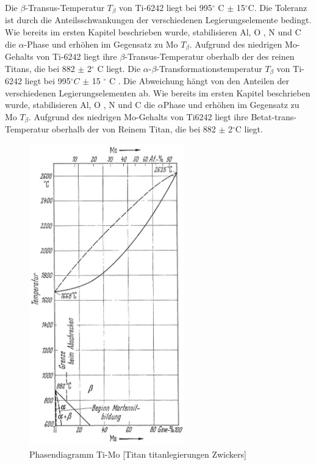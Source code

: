 	Die $\beta$-Transus-Temperatur $T_{\beta}$ von Ti-6242 liegt bei 995$^\circ$ C $\pm$ 15$^\circ$C. Die Toleranz ist durch die Anteilsschwankungen der verschiedenen Legierungselemente bedingt. Wie bereits im ersten Kapitel beschrieben wurde, stabilisieren  Al, O , N und C die $\alpha$-Phase und erhöhen im Gegensatz zu Mo $T_{\beta}$.
	Aufgrund des niedrigen Mo-Gehalts von Ti-6242 liegt ihre $\beta$-Transus-Temperatur oberhalb der des reinen Titans, die bei 882 $\pm$ 2$^\circ$ C liegt.
	Die $\alpha$-$\beta$-Transformationstemperatur $T_{\beta}$ von Ti-6242 liegt bei 995$^\circ C$ $\pm$ 15 $^\circ$ C . Die Abweichung hängt  von den Anteilen der verschiedenen Legierungselementen ab. Wie bereits im ersten Kapitel beschrieben wurde, stabilisieren  Al, O , N und C die $\alpha$Phase und erhöhen im Gegensatz zu Mo  {$T_{\beta}$}.
	Aufgrund des niedrigen Mo-Gehalts von Ti6242 liegt ihre Betat-trans-Temperatur oberhalb der von Reinem Titan, die bei 882 $\pm$ 2$^\circ$C liegt.
	
	
	\begin{figure}[H]
		\centering
		\includegraphics[width= 0.6\textwidth]{Bilder/TiMo}
		\caption{Phasendiagramm Ti-Mo [Titan titanlegierungen Zwickers]}
		\label{TiMo}
	\end{figure}
	
